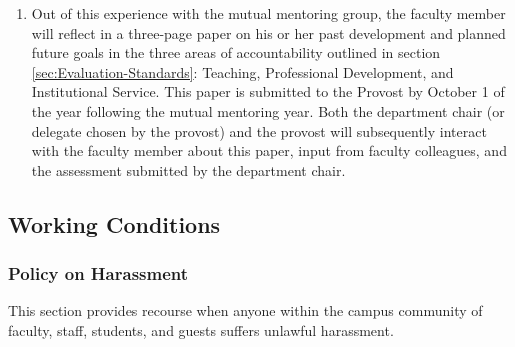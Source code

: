 \begin{enumerate}[label=\alph*)]
{\begin{enumerate}[label=\arabic*)]
						\item{ Out of this experience with the mutual mentoring group, the faculty
							member will reflect in a three-page paper on his or her past development and
							planned future goals in the three areas of accountability outlined in
							section
							\ref{sec:Evaluation-Standards}: Teaching, Professional Development, and Institutional Service. This
							paper is submitted to the Provost by October 1 of the year following the mutual
							mentoring year. Both the department chair (or delegate chosen by the provost)
							and the provost will subsequently interact with the faculty member about this
							paper, input from faculty colleagues, and the assessment submitted by the
							department chair. }
					\end{enumerate}
				}
			\end{enumerate}
	\subsection{Working Conditions}
		\subsubsection{Policy on Harassment}
			\label{sec:PolicyOnHarassment}

			This section provides recourse when anyone within the campus community of
			faculty, staff, students, and guests suffers unlawful harassment.

